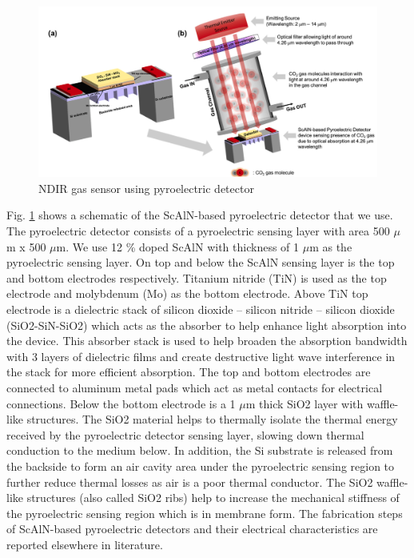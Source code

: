 \documentclass[12pt]{article}
\begin{document}
\begin{figure}[h]
\centering
\includegraphics[scale=0.5]{NDIR gas sensor with pyro.png}
\caption{NDIR gas sensor using pyroelectric detector}
\label{NDIR gas sensor using pyroelectric detector}
\end{figure}

Fig. \ref{NDIR gas sensor using pyroelectric detector} shows a schematic of the ScAlN-based pyroelectric detector 
that we use. The pyroelectric detector consists of a pyroelectric sensing 
layer with area 500 $\mu$m x 500 $\mu$m. We use 12 \% doped ScAlN with 
thickness of 1 $\mu$m as the pyroelectric sensing layer\cite{ranacher2019cmos}. On top and below the 
ScAlN sensing layer is the top and bottom electrodes respectively. Titanium nitride (TiN) is used as the top electrode and molybdenum (Mo) as 
the bottom electrode. Above TiN top electrode is a dielectric stack of 
silicon dioxide – silicon nitride – silicon dioxide (SiO2-SiN-SiO2) which 
acts as the absorber to help enhance light absorption into the device. This 
absorber stack is used to help broaden the absorption bandwidth with 3 
layers of dielectric films and create destructive light wave interference in the stack for more efficient absorption. The top and bottom electrodes are connected to aluminum metal pads which act as metal contacts 
for electrical connections. Below the bottom electrode is a 1 $\mu$m thick 
SiO2 layer with waffle-like structures\cite{hyseni2010analysis}. The SiO2 material helps to thermally isolate the thermal energy received by the pyroelectric detector 
sensing layer, slowing down thermal conduction to the medium below. In 
addition, the Si substrate is released from the backside to form an air 
cavity area under the pyroelectric sensing region to further reduce thermal losses as air is a poor thermal conductor. The SiO2 waffle-like 
structures (also called SiO2 ribs) help to increase the mechanical stiffness of the pyroelectric sensing region which is in membrane form\cite{odon2010modelling}. 
The fabrication steps of ScAlN-based pyroelectric detectors and their 
electrical characteristics are reported elsewhere in literature. 
\end{document}
